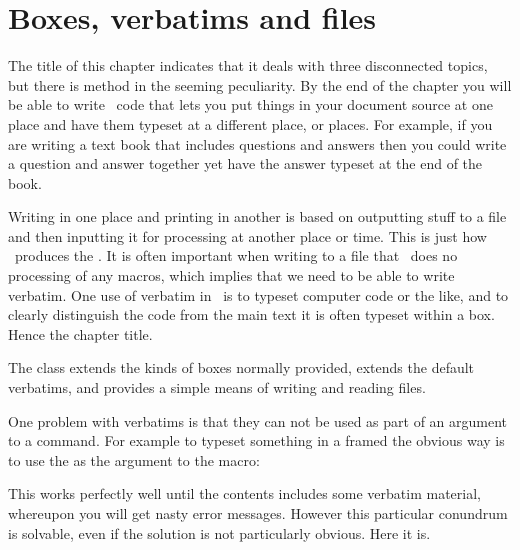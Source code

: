 \chapter{Boxes, verbatims and files} \label{chap:bvf}\label{chap:boxes}

    The title of this chapter indicates that it deals with three 
disconnected topics, but there is method in the seeming peculiarity.
By the end of the chapter you will be able to write \ltx\ code that
lets you put things in your document source at one place and have them
typeset at a different place, or places. For example, if you are writing
a text book that includes questions and answers then you could write 
a question and answer together yet have the answer typeset at the
end of the book. 

    Writing in one place and printing in another is based on outputting
stuff to a file and then inputting 
it for processing at another place 
or time. This is just how \ltx\ produces the \toc. It is often important
when writing to a file that \ltx\ does no processing of any macros, which
implies that we need to be able to write verbatim. One use of verbatim
in \ltx\ is to typeset computer code or the like, and to clearly
distinguish the code from the main text it is often typeset within a box.
Hence the chapter title.

    The class extends the kinds of boxes normally provided, 
extends the default verbatims, and provides a simple means 
of writing and reading files.

    One problem with verbatims is that they 
can not be used as part of
an argument to a command. For example to typeset something in a 
framed
 the obvious way is to use the  as the argument
to the \cmd{\fbox} macro:
\begin{lcode}
\end{lcode}
This works perfectly well until the contents includes some verbatim
material, whereupon you will get nasty 
error messages. However this 
particular conundrum is solvable, even if the solution is not particularly
obvious. Here it is.

